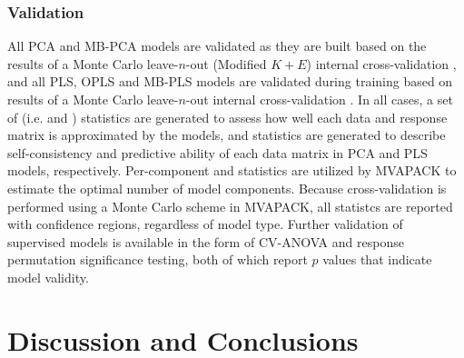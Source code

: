 \subsubsection{Validation}

\begin{doublespace}
All PCA and MB-PCA models are validated as they are built based on the results
of a Monte Carlo leave-$n$-out (Modified $K+E$) internal cross-validation
\cite{eastment:tech1982,eshghi:cils2014}, and all PLS, OPLS and MB-PLS models
are validated during training based on results of a Monte Carlo leave-$n$-out
internal cross-validation \cite{xu:cils2001,xu:jchemo2004}. In all cases, a
set of \rsq{} (i.e. \rsqx{} and \rsqy{}) statistics are generated to assess
how well each data and response matrix is approximated by the models, and
\qsq{} statistics are generated to describe self-consistency and predictive
ability of each data matrix in PCA and PLS models, respectively. Per-component
\rsq{} and \qsq{} statistics are utilized by MVAPACK to estimate the optimal
number of model components. Because cross-validation is performed using a
Monte Carlo scheme in MVAPACK, all \qsq{} statistcs are reported with
confidence regions, regardless of model type. Further validation of supervised
models is available in the form of CV-ANOVA \cite{eriksson:jchemo2008} and
response permutation \cite{westerhuis:metab2008a} significance testing, both
of which report $p$ values that indicate model validity.
\end{doublespace}

\section{Discussion and Conclusions}


